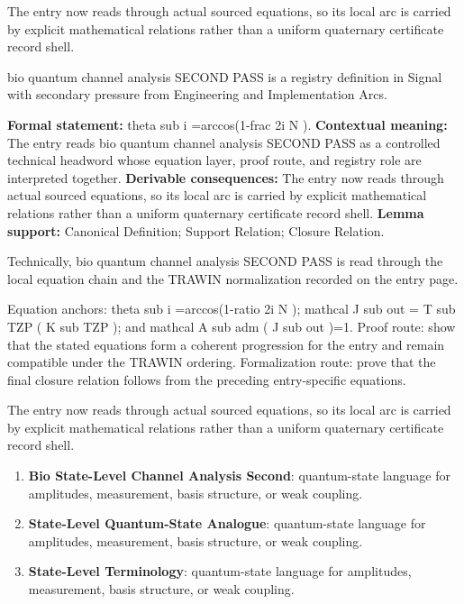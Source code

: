 The entry now reads through actual sourced equations, so its local arc is carried by explicit mathematical relations rather than a uniform quaternary certificate record shell.
\clearpage


\begingroup\small
{}
bio quantum channel analysis SECOND PASS is a registry definition in Signal with secondary pressure from Engineering and Implementation Arcs.

\begingroup\footnotesize\setlength{\emergencystretch}{3em}\sloppy
\textbf{Formal statement:} theta sub i =arccos(1-frac 2i N ). \textbf{Contextual meaning:} The entry reads bio quantum channel analysis SECOND PASS as a controlled technical headword whose equation layer, proof route, and registry role are interpreted together. \textbf{Derivable consequences:} The entry now reads through actual sourced equations, so its local arc is carried by explicit mathematical relations rather than a uniform quaternary certificate record shell. \textbf{Lemma support:} Canonical Definition; Support Relation; Closure Relation.\par
\endgroup

Technically, bio quantum channel analysis SECOND PASS is read through the local equation chain and the TRAWIN normalization recorded on the entry page.

Equation anchors: theta sub i =arccos(1-ratio 2i N ); mathcal J sub out = T sub TZP ( K sub TZP ); and mathcal A sub adm ( J sub out )=1. Proof route: show that the stated equations form a coherent progression for the entry and remain compatible under the TRAWIN ordering. Formalization route: prove that the final closure relation follows from the preceding entry-specific equations.

The entry now reads through actual sourced equations, so its local arc is carried by explicit mathematical relations rather than a uniform quaternary certificate record shell.
\endgroup

\begin{enumerate}[leftmargin=1.6em,itemsep=6pt,topsep=4pt]
\item \textbf{Bio State-Level Channel Analysis Second}: quantum-state language for amplitudes, measurement, basis structure, or weak coupling.
\item \textbf{State-Level Quantum-State Analogue}: quantum-state language for amplitudes, measurement, basis structure, or weak coupling.
\item \textbf{State-Level Terminology}: quantum-state language for amplitudes, measurement, basis structure, or weak coupling.
\end{enumerate}

